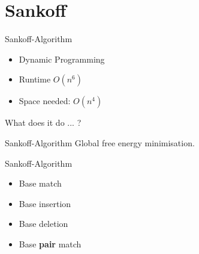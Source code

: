 \section{Sankoff}


\begin{frame}[c]{Sankoff-Algorithm}
    \Large
    \begin{itemize}[<+(1)->]
    \item Dynamic Programming
    \item Runtime $O(n^6)$
    \item Space needed: $O(n^4)$
    \end{itemize}
    \pause
    What does it do ... ?
\end{frame}


\begin{frame}[c]{Sankoff-Algorithm}
    Global free energy minimisation.
\end{frame}


\begin{frame}[c]{Sankoff-Algorithm}
    \begin{itemize}[<+(1)->]
    \item Base match
    \item Base insertion
    \item Base deletion
    \item Base \textbf{pair} match
    \end{itemize}
\end{frame}


